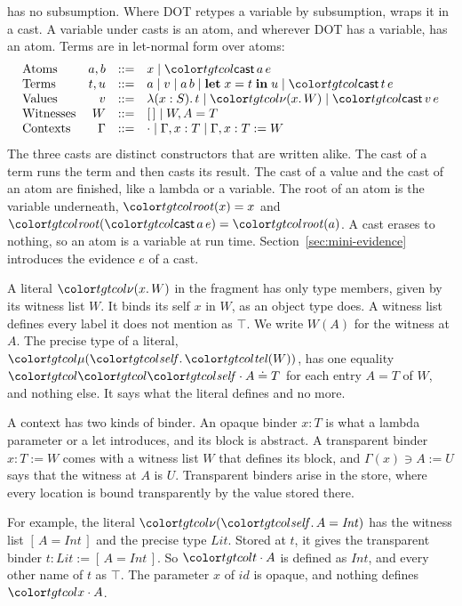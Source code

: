 \FCdot has no subsumption. Where DOT retypes a variable by subsumption, \FCdot wraps it in a cast. A variable under casts is an atom, and wherever DOT has a variable, \FCdot has an atom. Terms are in let-normal form over atoms:
\[
\begin{array}{@{}lrcl@{}}
\text{Atoms} & a, b & ::= & x \mid \ev{cast}\,a\,e \\
\text{Terms} & t, u & ::= & a \mid v \mid a\,b \mid \klet x = t \kin u \mid \ev{cast}\,t\,e \\
\text{Values} & v & ::= & \lambda(x : S).\,t \mid \tgt{\nu(x.\,W)} \mid \ev{cast}\,v\,e \\
\text{Witnesses} & W & ::= & \tnil \mid W, A = T \\
\text{Contexts} & \Gamma & ::= & \cdot \mid \Gamma, x : T \mid \Gamma, x : T \mathrel{:=} W
\end{array}
\]
The three casts are distinct constructors that are written alike. The cast of a term runs the term and then casts its result. The cast of a value and the cast of an atom are finished, like a lambda or a variable. The root of an atom is the variable underneath, $\rt{x} = x$ and $\rt{\ev{cast}\,a\,e} = \rt{a}$. A cast erases to nothing, so an atom is a variable at run time. Section~\ref{sec:mini-evidence} introduces the evidence $e$ of a cast.

A literal $\tgt{\nu(x.\,W)}$ in the fragment has only type members, given by its witness list $W$. It binds its self $x$ in $W$, as an object type does. A witness list defines every label it does not mention as $\top$. We write $W(A)$ for the witness at $A$. The precise type of a literal, $\obj{\tgt{\mathit{tel}(W)}}$, has one equality $\peq{\sel{\self}{A}}{T}$ for each entry $A = T$ of $W$, and nothing else. It says what the literal defines and no more.

A context has two kinds of binder. An opaque binder $x : T$ is what a lambda parameter or a let introduces, and its block is abstract. A transparent binder $x : T \mathrel{:=} W$ comes with a witness list $W$ that defines its block, and $\Gamma(x) \ni A \mathrel{:=} U$ says that the witness at $A$ is $U$. Transparent binders arise in the store, where every location is bound transparently by the value stored there.

For example, the literal $\tgt{\nu(\self.\,A = \mathit{Int})}$ has the witness list $[\,A = \mathit{Int}\,]$ and the precise type $\mathit{Lit}$. Stored at $t$, it gives the transparent binder $t : \mathit{Lit} \mathrel{:=} [\,A = \mathit{Int}\,]$. So $\sel{t}{A}$ is defined as $\mathit{Int}$, and every other name of $t$ as $\top$. The parameter $x$ of $\mathit{id}$ is opaque, and nothing defines $\sel{x}{A}$.

